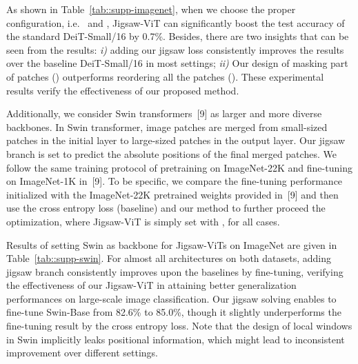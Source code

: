 \documentclass{article}
\begin{document}
As shown in Table~\ref{tab::supp-imagenet}, when we choose the proper configuration, i.e.~ and , Jigsaw-ViT can significantly boost the test accuracy of the standard DeiT-Small/16 by 0.7\%.
Besides, there are two insights that can be seen from the results:
\textit{i)}
adding our jigsaw loss consistently improves the results over the baseline DeiT-Small/16 in most settings;
\textit{ii)}
Our design of masking part of patches () outperforms reordering all the patches ().
These experimental results verify the effectiveness of our proposed method.

Additionally, we consider Swin transformers~[9] as larger and more diverse backbones.
In Swin transformer, image patches are merged from small-sized patches in the initial layer to large-sized patches in the output layer.
Our jigsaw branch is set to predict the absolute positions of the final merged patches.
We follow the same training protocol of pretraining on ImageNet-22K and fine-tuning on ImageNet-1K in~[9]. 
To be specific, we compare the fine-tuning performance initialized with the ImageNet-22K pretrained weights provided in~[9] and then use the cross entropy loss (baseline) and our method to further proceed the optimization, where Jigsaw-ViT is simply set with ,  for all cases.

Results of setting Swin as backbone for Jigsaw-ViTs on ImageNet are given in Table~\ref{tab::supp-swin}.
For almost all architectures on both datasets, adding jigsaw branch consistently improves upon the baselines by fine-tuning, verifying the effectiveness of our Jigsaw-ViT in attaining better generalization performances on large-scale image classification. 
Our jigsaw solving enables to fine-tune Swin-Base from 82.6\% to 85.0\%, though it slightly underperforms the fine-tuning result by the cross entropy loss. 
Note that the design of local windows in Swin implicitly leaks positional information, which might lead to inconsistent improvement over different settings.
\end{document}
